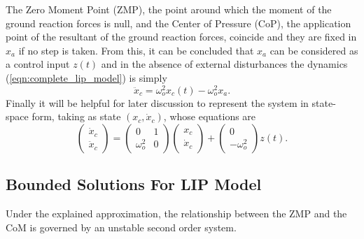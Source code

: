 \documentclass[11pt]{article}
\begin{document}
The Zero Moment Point (ZMP), the point around which the moment of the ground reaction forces is null, and the Center of Pressure (CoP), the application point of the resultant of the ground reaction forces, coincide and they are fixed in $x_a$ if no step is taken. From this, it can be concluded that $x_a$ can be considered as a control input $z(t)$ and in the absence of external disturbances the dynamics (\ref{eqn:complete_lip_model}) is simply
\begin{equation}
\label{eqn:point_foot_model}
\ddot{x}_c = \omega_o^2x_c(t) - \omega_o^2x_a.
\end{equation}
Finally it will be helpful for later discussion to represent the system in state-space form, taking as state $(x_c,\dot{x}_c)$, whose equations are
\begin{equation}
\label{eqn:lip_state_space}
\begin{pmatrix}
\dot{x}_c\\
\ddot{x}_c
\end{pmatrix}=\begin{pmatrix}
0 & 1\\
\omega_o^2 & 0
\end{pmatrix}\begin{pmatrix}
x_c \\
\dot{x}_c
\end{pmatrix}+\begin{pmatrix}
0 \\
-\omega_o^2
\end{pmatrix}z(t).
\end{equation}

\subsection{Bounded Solutions For LIP Model}

Under the explained approximation, the relationship between the ZMP and the CoM is governed by an unstable second order system.
\end{document}
